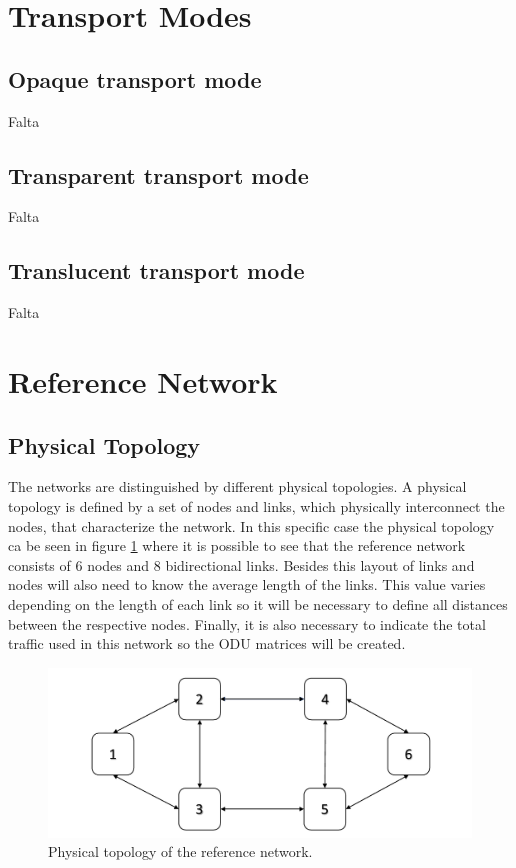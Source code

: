\section{Transport Modes}\label{transport_mode}
\subsection{Opaque transport mode}
Falta
\subsection{Transparent transport mode}
Falta
\subsection{Translucent transport mode}
Falta
\newpage
\section{Reference Network}\label{reference_network}
\subsection{Physical Topology}\label{Reference_Network_Topology}

The networks are distinguished by different physical topologies.
A physical topology is defined by a set of nodes and links, which physically interconnect the nodes, that characterize the network.
In this specific case the physical topology ca be seen in figure \ref{physical_top_ref_net} where it is possible to see that the reference network consists of 6 nodes and 8 bidirectional links.
Besides this layout of links and nodes will also need to know the average length of the links.
This value varies depending on the length of each link so it will be necessary to define all distances between the respective nodes.
Finally, it is also necessary to indicate the total traffic used in this network so the ODU matrices will be created.\\

\begin{figure}[h!]
\centering
\includegraphics[width=\textwidth]{sdf/reference_network/figures/RedeTeste}
\caption{Physical topology of the reference network.}
\label{physical_top_ref_net}
\end{figure}

